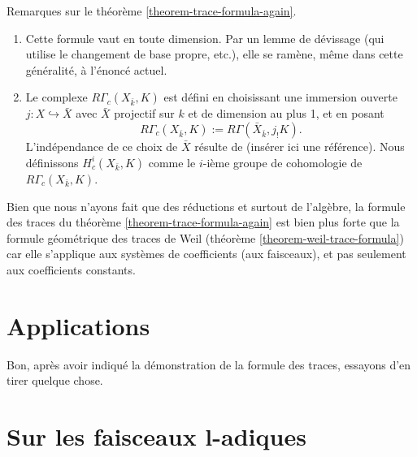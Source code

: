 \begin{remark}
\label{remark-on-trace-formula-again}
Remarques sur le théorème \ref{theorem-trace-formula-again}.
\begin{enumerate}
\item
Cette formule vaut en toute dimension. Par un lemme de d\'evissage (qui utilise le changement de
base propre, etc.), elle se ramène, même dans cette généralité, à l'énoncé actuel.
\item
Le complexe $R\Gamma_c(X_{\bar k}, K)$ est défini en choisissant une immersion ouverte
$j : X \hookrightarrow \bar X$ avec $\bar X$ projectif sur $k$ et de dimension au
plus 1, et en posant
$$
R\Gamma_c(X_{\bar k}, K) := R\Gamma(\bar X_{\bar k}, j_!K).
$$
L'indépendance de ce choix de $\bar X$ résulte de
(insérer ici une référence). Nous définissons $H^i_c(X_{\bar k}, K)$
comme le $i$-ième groupe de cohomologie de $R\Gamma_c(X_{\bar k}, K)$.
\end{enumerate}
\end{remark}

\begin{remark}
\label{remark-stronger}
Bien que nous n'ayons fait que des réductions et surtout de l'algèbre, la formule des traces
du théorème \ref{theorem-trace-formula-again} est bien plus forte que
la formule géométrique des traces de Weil (théorème \ref{theorem-weil-trace-formula})
car elle s'applique aux systèmes de coefficients
(aux faisceaux), et pas seulement aux coefficients constants.
\end{remark}


\section{Applications}
\label{section-applications}

\noindent
Bon, après avoir indiqué la démonstration de la formule des traces, essayons d'en tirer
quelque chose.





\section{Sur les faisceaux l-adiques}
\label{section-l-adic-sheaves}

